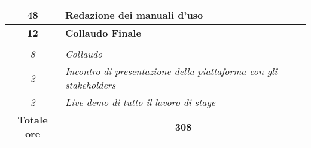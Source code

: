 \begin{tabularx}{\textwidth}{|c|X|}
	\textbf{48} & \textbf{Redazione dei manuali d'uso}  \\
    \hline    
    
    \textbf{12} & \textbf{Collaudo Finale}  \\ \hdashline 
    \multirow{4}{0cm}\\ 
    \textit{8} & 
    \textit{Collaudo} \\
    \textit{2} & 
    \textit{Incontro di presentazione della piattaforma con gli stakeholders} \\
    \textit{2} & 
    \textit{Live demo di tutto il lavoro di stage} \\
    \hline
	
	\textbf{Totale ore} & \multicolumn{1}{|c|}{\textbf{308}} \\\hline
	
\end{tabularx}

